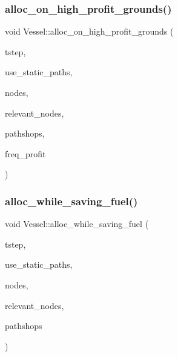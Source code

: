 \subsubsection{\texorpdfstring{alloc\_on\_high\_profit\_grounds()}{alloc\_on\_high\_profit\_grounds()}}
{\footnotesize\ttfamily void Vessel\+::alloc\+\_\+on\+\_\+high\+\_\+profit\+\_\+grounds (\begin{DoxyParamCaption}\item[{int}]{tstep,  }\item[{int}]{use\+\_\+static\+\_\+paths,  }\item[{vector$<$ \mbox{\hyperlink{class_node}{Node}} $\ast$ $>$ \&}]{nodes,  }\item[{const std\+::vector$<$ \mbox{\hyperlink{classtypes_1_1_node_id}{types\+::\+Node\+Id}} $>$ \&}]{relevant\+\_\+nodes,  }\item[{const std\+::vector$<$ \mbox{\hyperlink{class_path_shop}{Path\+Shop}} $>$ \&}]{pathshops,  }\item[{std\+::ofstream \&}]{freq\+\_\+profit }\end{DoxyParamCaption})}

\mbox{\label{class_vessel_a422d7c893cf700562a7ec938f0f7262d}} 
\subsubsection{\texorpdfstring{alloc\_while\_saving\_fuel()}{alloc\_while\_saving\_fuel()}}
{\footnotesize\ttfamily void Vessel\+::alloc\+\_\+while\+\_\+saving\+\_\+fuel (\begin{DoxyParamCaption}\item[{int}]{tstep,  }\item[{int}]{use\+\_\+static\+\_\+paths,  }\item[{vector$<$ \mbox{\hyperlink{class_node}{Node}} $\ast$ $>$ \&}]{nodes,  }\item[{const std\+::vector$<$ \mbox{\hyperlink{classtypes_1_1_node_id}{types\+::\+Node\+Id}} $>$ \&}]{relevant\+\_\+nodes,  }\item[{const std\+::vector$<$ \mbox{\hyperlink{class_path_shop}{Path\+Shop}} $>$ \&}]{pathshops }\end{DoxyParamCaption})}

\mbox{\label{class_vessel_a76f874c94638b6e4f9d88320172f4b04}} 
